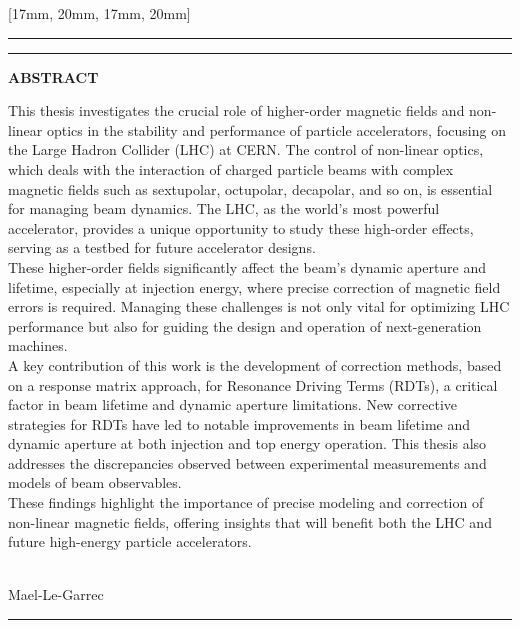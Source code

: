 \documentclass[coverheight=240mm,
               coverwidth=175mm, 
               spinewidth=15mm,
               markcolor=black,
               bleedwidth=0mm,
               marklength=0mm]{bookcover}
\begin{document}
\begin{bookcover}
[17mm, 20mm, 17mm, 20mm]{

\noindent\rule[0.5em]{\partwidth}{1.5pt}\vspace{-4pt}
\noindent\rule[0.5em]{\partwidth}{1.5pt}\vspace{-4pt}
\vspace{1cm}

{\centering\bfseries\Large ABSTRACT\\[10mm]}%

{
\fontsize{11pt}{11pt}\selectfont
This thesis investigates the crucial role of higher-order magnetic fields and non-linear optics in
the stability and performance of particle accelerators, focusing on the Large Hadron Collider (LHC)
at CERN. The control of non-linear optics, which deals with the interaction of charged particle 
beams with complex magnetic fields such as sextupolar, octupolar, decapolar, and so on, is essential
for managing beam dynamics. The LHC, as the world's most powerful accelerator, provides a unique
opportunity to study these high-order effects, serving as a testbed for future accelerator designs.
\\

These higher-order fields significantly affect the beam's dynamic aperture and lifetime, especially
at injection energy, where precise correction of magnetic field errors is required. Managing these
challenges is not only vital for optimizing LHC performance but also for guiding the design and
operation of next-generation machines.
\\

A key contribution of this work is the development of correction methods, based on a response matrix
approach, for Resonance Driving Terms (RDTs), a critical factor in beam lifetime and dynamic
aperture limitations. New corrective strategies for RDTs have led to notable improvements in beam
lifetime and dynamic aperture at both injection and top energy operation. This thesis also addresses
the discrepancies observed between experimental measurements and models of beam observables.
\\

These findings highlight the importance of precise modeling and correction of non-linear magnetic
fields, offering insights that will benefit both the LHC and future high-energy particle
accelerators.

}

\vfill

\centering
{}
\\[2mm]
 Mael-Le-Garrec

\vspace{1cm}

\noindent\rule[0.5em]{\partwidth}{1.5pt}%

}
\end{bookcover}
\end{document}
